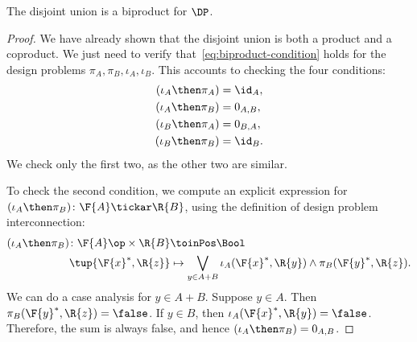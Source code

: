 \begin{lemma}
The disjoint union is a biproduct for $\DP$.
\end{lemma}
\begin{proof}
    We have already shown that the disjoint union is both
    a product and a coproduct. We just need to verify that~\eqref{eq:biproduct-condition} holds
    for the design problems $\pi_A, \pi_B, \iota_A, \iota_B$.
    This accounts to checking the four conditions:
    \begin{equation}
    \begin{aligned}
        (\iota_A\then \pi_A) &= \id_{A}, \\
        (\iota_A\then \pi_B) &= 0_{A,B}, \\
        (\iota_B\then \pi_A) &= 0_{B,A},\\
        (\iota_B\then \pi_B) &= \id_{B}.
    \end{aligned}
    \end{equation}
    We check only the first two, as the other two are similar.

    To check the second condition, we compute an explicit expression for $(\iota_A\then \pi_B)\colon \F{A} \tickar \R{B}$, using the definition
    of design problem interconnection:
    \begin{equation}
    \begin{aligned}
        (\iota_A\then \pi_B) \colon  \F{A}\op\times \R{B} & \toinPos \Bool \\
                            \tup{\F{x}^*, \R{z}} &\mapsto
                            \bigvee_{y \in A + B} \iota_A(\F{x}^*,\R{y}) \wedge \pi_B(\F{y}^*,\R{z}).
    \end{aligned}
    \end{equation}
    We can do a case analysis for $y\in A+B$. Suppose $y\in A$.
    Then $\pi_B(\F{y}^*,\R{z}) = \false$. If $y \in B$, then $\iota_A(\F{x}^*,\R{y}) = \false$.
    Therefore, the sum is always false, and hence $(\iota_A\then \pi_B) = 0_{A,B}$.


\end{proof}

